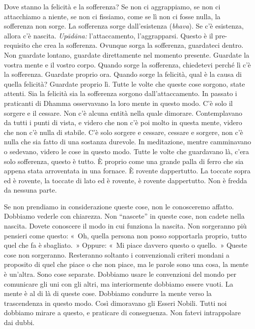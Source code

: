 Dove stanno la felicità e la sofferenza? Se non ci aggrappiamo, se non
ci attacchiamo a niente, se non ci fissiamo, come se lì non ci fosse
nulla, la sofferenza non sorge. La sofferenza sorge dall'esistenza
(\emph{bhava}). Se c'è esistenza, allora c'è nascita. \emph{Upādāna:}
l'attaccamento, l'aggrapparsi. Questo è il pre-requisito che crea la
sofferenza. Ovunque sorga la sofferenza, guardateci dentro. Non guardate
lontano, guardate direttamente nel momento presente. Guardate la vostra
mente e il vostro corpo. Quando sorge la sofferenza, chiedetevi perché
lì c'è la sofferenza. Guardate proprio ora. Quando sorge la felicità,
qual è la causa di quella felicità? Guardate proprio lì. Tutte le volte
che queste cose sorgono, state attenti. Sia la felicità sia la
sofferenza sorgono dall'attaccamento. In passato i praticanti di Dhamma
osservavano la loro mente in questo modo. C'è solo il sorgere e il
cessare. Non c'è alcuna entità nella quale dimorare. Contemplavano da
tutti i punti di vista, e videro che non c'è poi molto in questa mente,
videro che non c'è nulla di stabile. C'è solo sorgere e cessare, cessare
e sorgere, non c'è nulla che sia fatto di una sostanza durevole. In
meditazione, mentre camminavano o sedevano, videro le cose in questo
modo. Tutte le volte che guardavano là, c'era solo sofferenza, questo è
tutto. È proprio come una grande palla di ferro che sia appena stata
arroventata in una fornace. È rovente dappertutto. La toccate sopra ed è
rovente, la toccate di lato ed è rovente, è rovente dappertutto. Non è
fredda da nessuna parte.

Se non prendiamo in considerazione queste cose, non le conosceremo
affatto. Dobbiamo vederle con chiarezza. Non ``nascete'' in queste cose,
non cadete nella nascita. Dovete conoscere il modo in cui funziona la
nascita. Non sorgeranno più pensieri come questo: «~Oh, quella persona
non posso sopportarla proprio, tutto quel che fa è sbagliato.~» Oppure:
«~Mi piace davvero questo o quello.~» Queste cose non sorgeranno.
Resteranno soltanto i convenzionali criteri mondani a proposito di quel
che piace o che non piace, ma le parole sono una cosa, la mente è
un'altra. Sono cose separate. Dobbiamo usare le convenzioni del mondo
per comunicare gli uni con gli altri, ma interiormente dobbiamo essere
vuoti. La mente è al di là di queste cose. Dobbiamo condurre la mente
verso la trascendenza in questo modo. Così dimoravano gli Esseri Nobili.
Tutti noi dobbiamo mirare a questo, e praticare di conseguenza. Non
fatevi intrappolare dai dubbi.

